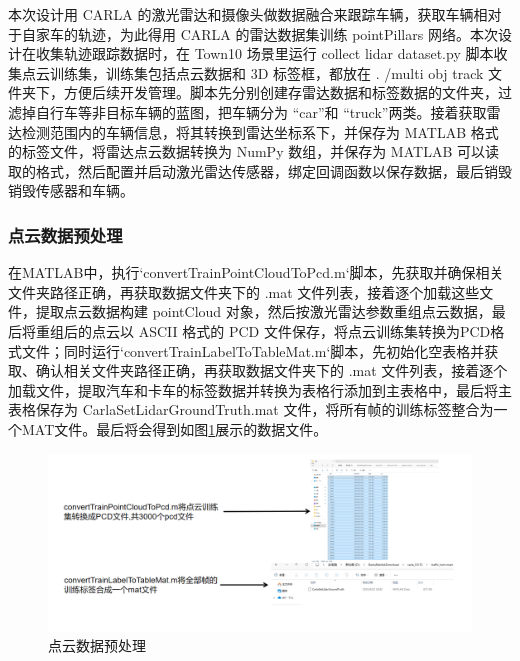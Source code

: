本次设计用 CARLA 的激光雷达和摄像头做数据融合来跟踪车辆，获取车辆相对于自家车的轨迹，为此得用 CARLA 的雷达数据集训练 pointPillars 网络。本次设计在收集轨迹跟踪数据时，在 Town10 场景里运行 collect lidar dataset.py 脚本收集点云训练集，训练集包括点云数据和 3D 标签框，都放在 . /multi obj track 文件夹下，方便后续开发管理。脚本先分别创建存雷达数据和标签数据的文件夹，过滤掉自行车等非目标车辆的蓝图，把车辆分为 “car”和 “truck”两类。接着获取雷达检测范围内的车辆信息，将其转换到雷达坐标系下，并保存为 MATLAB 格式的标签文件，将雷达点云数据转换为 NumPy 数组，并保存为 MATLAB 可以读取的格式，然后配置并启动激光雷达传感器，绑定回调函数以保存数据，最后销毁销毁传感器和车辆。

\subsubsection{点云数据预处理}
在MATLAB中，执行`convertTrainPointCloudToPcd.m`脚本，先获取并确保相关文件夹路径正确，再获取数据文件夹下的 .mat 文件列表，接着逐个加载这些文件，提取点云数据构建 pointCloud 对象，然后按激光雷达参数重组点云数据，最后将重组后的点云以 ASCII 格式的 PCD 文件保存，将点云训练集转换为PCD格式文件；同时运行`convertTrainLabelToTableMat.m`脚本，先初始化空表格并获取、确认相关文件夹路径正确，再获取数据文件夹下的 .mat 文件列表，接着逐个加载文件，提取汽车和卡车的标签数据并转换为表格行添加到主表格中，最后将主表格保存为 CarlaSetLidarGroundTruth.mat 文件，将所有帧的训练标签整合为一个MAT文件。最后将会得到如图\ref{fig:p10}展示的数据文件。




\begin{figure}[htbp] %
	\centering
	\includegraphics[width=1\textwidth]{p10} %
	\caption{点云数据预处理} %
	\label{fig:p10} %
\end{figure}





